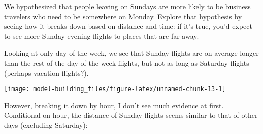 \documentclass[]{book}
\newenvironment{Shaded}{\begin{snugshade}}{\end{snugshade}}
\newcommand{\DataTypeTok}[1]{\textcolor[rgb]{0.13,0.29,0.53}{#1}}
\newcommand{\KeywordTok}[1]{\textcolor[rgb]{0.13,0.29,0.53}{\textbf{#1}}}
\newcommand{\NormalTok}[1]{#1}
\newcommand{\OperatorTok}[1]{\textcolor[rgb]{0.81,0.36,0.00}{\textbf{#1}}}
\newcommand{\OtherTok}[1]{\textcolor[rgb]{0.56,0.35,0.01}{#1}}
\newcommand{\StringTok}[1]{\textcolor[rgb]{0.31,0.60,0.02}{#1}}
\theoremstyle{plain}
\theoremstyle{remark}
\begin{document}
We hypothesized that people leaving on Sundays are more likely to be
business travelers who need to be somewhere on Monday. Explore that
hypothesis by seeing how it breaks down based on distance and time: if
it's true, you'd expect to see more Sunday evening flights to places
that are far away.

Looking at only day of the week, we see that Sunday flights are on
average longer than the rest of the day of the week flights, but not as
long as Saturday flights (perhaps vacation flights?).

\begin{Shaded}
\end{Shaded}

\begin{center}\texttt{[image: model-building\_files/figure-latex/unnamed-chunk-13-1]} \end{center}

However, breaking it down by hour, I don't see much evidence at first.
Conditional on hour, the distance of Sunday flights seems similar to
that of other days (excluding Saturday):

\begin{Shaded}
\end{Shaded}
\end{document}
